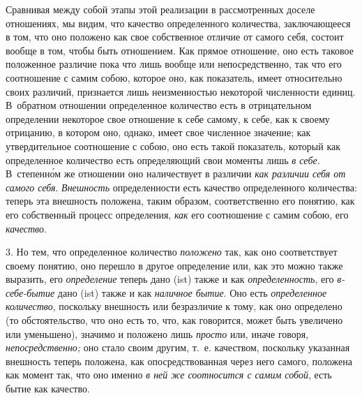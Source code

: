 Сравнивая между собой этапы этой реализации в рассмотренных доселе отношениях,
мы видим, что качество определенного количества, заключающееся в том, что оно
положено как свое собственное отличие от самого себя, состоит вообще в том,
чтобы быть отношением. Как прямое отношение, оно есть таковое положенное
различие пока что лишь вообще или непосредственно, так что его соотношение с
самим собою, которое оно, как показатель, имеет относительно своих различий,
признается лишь неизменностью некоторой численности единиц. В~обратном
отношении определенное количество есть в отрицательном определении некоторое
свое отношение к себе самому, к себе, как к своему отрицанию, в котором оно,
однако, имеет свое численное значение; как утвердительное соотношение с собою,
оно есть такой показатель, который как определенное количество есть
определяющий свои моменты лишь {\em в себе}. В~степенн\'{о}м же отношении оно
наличествует в различии {\em как различии себя от самого себя}. {\em Внешность}
определенности есть качество определенного количества: теперь эта внешность
положена, таким образом, соответственно его понятию, как его собственный
процесс определения, {\em как} его соотношение с самим собою, его
{\em качество}.

3. Но тем, что определенное количество {\em положено} так, как оно
соответствует своему понятию, оно перешло в другое определение или, как это
можно также выразить, его {\em определение} теперь дано (ist) также и как
{\em определенность}, его {\em в-себе-бытие} дано (ist) также и как
{\em наличное бытие}. Оно есть {\em определенное количество}, поскольку
внешность или безразличие к тому, как оно определено (то обстоятельство, что
оно есть то, что, как говорится, может быть увеличено или уменьшено), значимо и
положено лишь {\em просто} или, иначе говоря, {\em непосредственно;} оно стало
своим другим, т.~е. качеством, поскольку указанная внешность теперь положена,
как опосредствованная через него самого, положена как момент так, что оно
именно {\em в ней же соотносится с самим собой}, есть бытие как качество.

